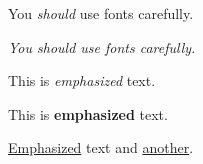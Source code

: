 \documentclass{article}
\begin{document}
You \emph{should} use fonts carefully.

\textit{%
You \emph{should} use fonts carefully.}

This is {\em emphasized\/} text.

\newcommand\Emph{\textbf}
This is \Emph{emphasized} text.

\underline{Emphasized} text and
\underline{another}.
\end{document}
